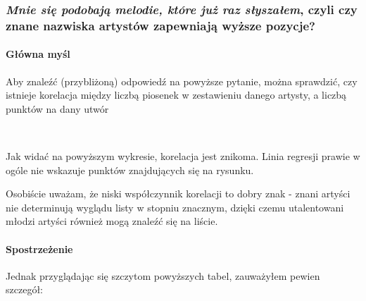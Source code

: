 \documentclass[11pt]{article}
\begin{document}
\hypertarget{mnie-siux119-podobajux105-melodie-ktuxf3re-juux17c-raz-sux142yszaux142em-czyli-czy-znane-nazwiska-artystuxf3w-zapewniajux105-wyux17csze-pozycje}{%
\subsubsection{\texorpdfstring{\emph{Mnie się podobają melodie, które
już raz słyszałem}, czyli czy znane nazwiska artystów zapewniają wyższe
pozycje?}{Mnie się podobają melodie, które już raz słyszałem, czyli czy znane nazwiska artystów zapewniają wyższe pozycje?}}\label{mnie-siux119-podobajux105-melodie-ktuxf3re-juux17c-raz-sux142yszaux142em-czyli-czy-znane-nazwiska-artystuxf3w-zapewniajux105-wyux17csze-pozycje}}

\hypertarget{gux142uxf3wna-myux15bl}{%
\paragraph{Główna myśl}\label{gux142uxf3wna-myux15bl}}

Aby znaleźć (przybliżoną) odpowiedź na powyższe pytanie, można
sprawdzić, czy istnieje korelacja między liczbą piosenek w zestawieniu
danego artysty, a liczbą punktów na dany utwór

    \begin{center}
    \end{center}
    { \hspace*{\fill} \\}
    
    Jak widać na powyższym wykresie, korelacja jest znikoma. Linia regresji
prawie w ogóle nie wskazuje punktów znajdujących się na rysunku.

Osobiście uważam, że niski współczynnik korelacji to dobry znak - znani
artyści nie determinują wyglądu listy w stopniu znacznym, dzięki czemu
utalentowani młodzi artyści również mogą znaleźć się na liście.

\hypertarget{spostrzeux17cenie}{%
\paragraph{Spostrzeżenie}\label{spostrzeux17cenie}}

Jednak przyglądając się szczytom powyższych tabel, zauważyłem pewien
szczegół:
\end{document}
